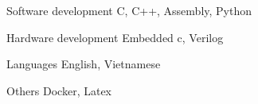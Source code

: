 

\begin{cvskills}




  \cvskill
    {Software development} %
    {C, C++, Assembly, Python} %

  \cvskill
    {Hardware development} %
    {Embedded c, Verilog} %

  \cvskill
    {Languages} %
    {English, Vietnamese} %

  \cvskill
    {Others} %
    {Docker, Latex} %

\end{cvskills}
